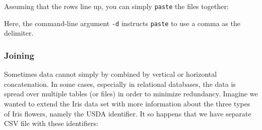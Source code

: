 \documentclass[
]{book}
\newenvironment{Shaded}{\begin{snugshade}}{\end{snugshade}}
\newcommand{\BuiltInTok}[1]{#1}
\newcommand{\DataTypeTok}[1]{\textcolor[rgb]{0.13,0.29,0.53}{#1}}
\newcommand{\ExtensionTok}[1]{#1}
\newcommand{\FunctionTok}[1]{\textcolor[rgb]{0.00,0.00,0.00}{#1}}
\newcommand{\KeywordTok}[1]{\textcolor[rgb]{0.13,0.29,0.53}{\textbf{#1}}}
\newcommand{\NormalTok}[1]{#1}
\theoremstyle{definition}
\theoremstyle{definition}
\theoremstyle{definition}
\theoremstyle{remark}
\begin{document}
Assuming that the rows line up, you can simply \texttt{paste} \citep{paste} the files together:

\begin{Shaded}
\end{Shaded}

Here, the command-line argument \texttt{-d} instructs \texttt{paste} to use a comma as the delimiter.

\hypertarget{joining}{%
\subsubsection{Joining}\label{joining}}

Sometimes data cannot simply by combined by vertical or horizontal concatenation. In some cases, especially in relational databases, the data is spread over multiple tables (or files) in order to minimize redundancy. Imagine we wanted to extend the Iris data set with more information about the three types of Iris flowers, namely the USDA identifier. It so happens that we have separate CSV file with these identifiers:
\end{document}
